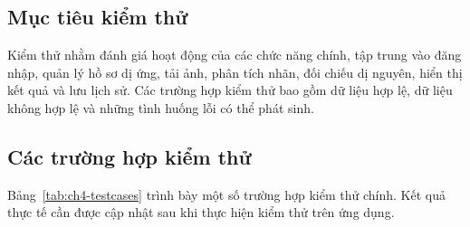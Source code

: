 \subsection{Mục tiêu kiểm thử}

Kiểm thử nhằm đánh giá hoạt động của các chức năng chính, tập trung vào đăng nhập, quản lý hồ sơ dị ứng, tải ảnh, phân tích nhãn, đối chiếu dị nguyên, hiển thị kết quả và lưu lịch sử. Các trường hợp kiểm thử bao gồm dữ liệu hợp lệ, dữ liệu không hợp lệ và những tình huống lỗi có thể phát sinh.

\subsection{Các trường hợp kiểm thử}

Bảng~\ref{tab:ch4-testcases} trình bày một số trường hợp kiểm thử chính. Kết quả thực tế cần được cập nhật sau khi thực hiện kiểm thử trên ứng dụng.

